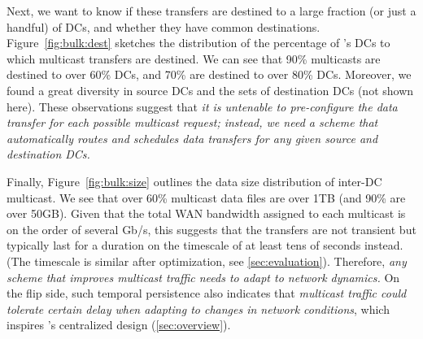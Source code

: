 \vspace{0.1cm}
Next, we want to know if these transfers are destined to
a large fraction (or just a handful) of DCs, and whether
they have common destinations.
Figure~\ref{fig:bulk:dest} sketches the distribution of the
percentage of \company's DCs to which multicast
transfers are destined.
We can see that 90\% multicasts are destined
to over 60\% DCs, and 70\% are destined
to over 80\% DCs.
Moreover, we found a great diversity in
source DCs and the sets of destination DCs (not shown here).
These observations suggest that {\em it is untenable
to pre-configure the data transfer for each possible multicast
request; instead, we need a scheme that automatically routes and
schedules data transfers for any given source and destination
DCs.}


Finally, Figure~\ref{fig:bulk:size} outlines the data size distribution of inter-DC multicast.
We see that over 60\% multicast data files are over 1TB
(and 90\% are over 50GB).
Given that the total WAN bandwidth assigned to each multicast
is on the order of several Gb/s,
this suggests that the transfers are not transient but
typically last for a duration on the timescale of at least tens of
seconds instead. (The timescale is similar after optimization, see \Section\ref{sec:evaluation}).
Therefore, {\em any scheme that improves multicast traffic needs to
adapt to network dynamics.}
On the flip side, such temporal persistence
also indicates that {\em multicast traffic could tolerate certain delay
when adapting to changes in network conditions}, which inspires
\name's centralized design (\Section\ref{sec:overview}).


